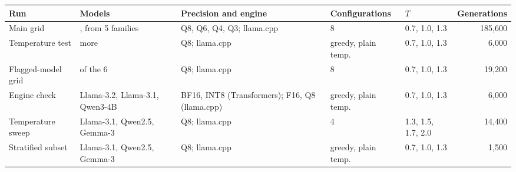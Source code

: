 \begin{tabular}{@{}l>{\raggedright\arraybackslash}p{2.9cm}>{\raggedright\arraybackslash}p{3.5cm}llr@{}}
\toprule
Run & Models & Precision and engine & Configurations & $T$ & Generations \\
\midrule
Main grid & 7, from 5 families & Q8, Q6, Q4, Q3; llama.cpp & 8 & 0.7, 1.0, 1.3 & 185,600 \\
Temperature test & 6 more & Q8; llama.cpp & greedy, plain temp. & 0.7, 1.0, 1.3 & 6,000 \\
Flagged-model grid & 3 of the 6 & Q8; llama.cpp & 8 & 0.7, 1.0, 1.3 & 19,200 \\
Engine check & Llama-3.2, Llama-3.1, Qwen3-4B & BF16, INT8 (Transformers); F16, Q8 (llama.cpp) & greedy, plain temp. & 0.7, 1.0, 1.3 & 6,000 \\
Temperature sweep & Llama-3.1, Qwen2.5, Gemma-3 & Q8; llama.cpp & 4 & 1.3, 1.5, 1.7, 2.0 & 14,400 \\
Stratified subset & Llama-3.1, Qwen2.5, Gemma-3 & Q8; llama.cpp & greedy, plain temp. & 0.7, 1.0, 1.3 & 1,500 \\
\bottomrule
\end{tabular}
